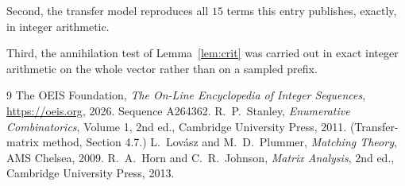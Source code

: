 \documentclass[11pt,a4paper]{article}
\theoremstyle{plain}
\theoremstyle{definition}
\begin{document}
Second, the transfer model reproduces all $15$ terms this entry publishes, exactly, in
integer arithmetic.

Third, the annihilation test of Lemma~\ref{lem:crit} was carried out in exact integer
arithmetic on the whole vector rather than on a sampled prefix.

\begin{thebibliography}{9}
 The OEIS Foundation, \emph{The On-Line Encyclopedia of Integer
Sequences}, \url{https://oeis.org}, 2026. Sequence A264362.
 R.~P.~Stanley, \emph{Enumerative Combinatorics}, Volume 1, 2nd ed.,
Cambridge University Press, 2011. (Transfer-matrix method, Section 4.7.)
 L.~Lov\'asz and M.~D.~Plummer, \emph{Matching Theory}, AMS Chelsea, 2009.
 R.~A.~Horn and C.~R.~Johnson, \emph{Matrix Analysis}, 2nd ed., Cambridge
University Press, 2013.
\end{thebibliography}
\end{document}
